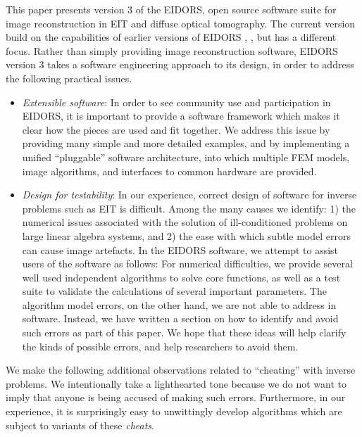 \documentclass[12pt]{iopart}
\begin{document}
This paper presents version 3 of the EIDORS,
open source software suite for image reconstruction
in EIT and diffuse optical tomography.
The current version build on the capabilities of
earlier versions of EIDORS \cite{Vauhkonen_etal_2000},
\cite{Polydorides_and_Lionheart_2002}, but
has a different focus. Rather than
simply providing image reconstruction software, 
EIDORS version 3 takes a software engineering
approach to its design, in order to address the
following practical issues.

\begin{itemize}

  \item {\em Extensible software}:
  In order to see community use and participation
  in EIDORS, it is important to provide a 
  software framework which makes it clear how
  the pieces are used and fit together.
  We address this issue by providing many simple
  and more detailed examples, and by implementing
  a unified ``pluggable'' software architecture,
  into which multiple FEM models, image algorithms, and
  interfaces to common hardware are provided.

  \item {\em Design for testability}:
  In our experience, correct design of software for
  inverse problems such as EIT is difficult. Among the
  many causes we identify: 1) the numerical issues associated
  with the solution of ill-conditioned problems on
  large linear algebra systems, and 2) the ease with which
  subtle model errors can cause image artefacts.
  In the EIDORS software, we attempt to assist 
  users of the software as follows:
  For numerical difficulties, we provide several well used independent
  algorithms to solve core functions, as well as a test suite
  to validate the calculations of several important parameters.
  The algorithm model errors, on the other
  hand, we are not able to address in software. Instead, we
  have written a section on how to identify and avoid such
  errors as part of this paper.
  We hope that these ideas will help clarify the kinds of
  possible errors, and help researchers to avoid them.

\end{itemize}

We make the following additional observations related to 
``cheating'' with inverse problems.
We intentionally take a
lighthearted tone because we do not want to
imply that anyone is being accused of making such errors.
Furthermore, in our experience, it 
is surprisingly easy to unwittingly develop
algorithms which are subject to variants of these {\em cheats}.
\end{document}
